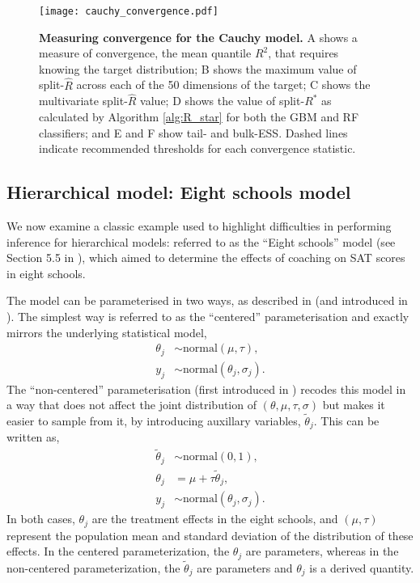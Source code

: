 \documentclass{article}
\begin{document}
\begin{figure}[!htb]
	\centerline{\texttt{[image: cauchy\_convergence.pdf]}}
	\caption{\textbf{Measuring convergence for the Cauchy model.} A shows a measure of convergence, the mean quantile $R^2$, that requires knowing the target distribution; B shows the maximum value of split-$\widehat{R}$ across each of the 50 dimensions of the target; C shows the multivariate split-$\widehat{R}$ value; D shows the value of split-$R^*$ as calculated by Algorithm \ref{alg:R_star} for both the GBM and RF classifiers; and E and F show tail- and bulk-ESS. Dashed lines indicate recommended thresholds for each convergence statistic.}
	\label{fig:cauchy_convergence}
\end{figure}

\subsection{Hierarchical model: Eight schools model}\label{sec:eight_shools}
We now examine a classic example used to highlight difficulties in performing inference for hierarchical models: referred to as the ``Eight schools'' model (see Section 5.5 in \cite{gelman2013bayesian}), which aimed to determine the effects of coaching on SAT scores in eight schools. 

The model can be parameterised in two ways, as described in \cite{vehtari2019rank} (and introduced in \cite{van2001art}). The simplest way is referred to as the ``centered'' parameterisation and exactly mirrors the underlying statistical model,
%
\begin{align*}
\theta_j &\sim \text{normal}(\mu, \tau), \\
y_j &\sim \text{normal}(\theta_j, \sigma_j).
\end{align*}
%
The ``non-centered'' parameterisation (first introduced in \cite{van2001art}) recodes this model in a way that does not affect the joint distribution of $(\theta, \mu, \tau, \sigma)$ but makes it easier to sample from it, by introducing auxillary variables, $\tilde \theta_j$. This can be written as,
%
\begin{align*}
\tilde{\theta}_j &\sim \text{normal}(0, 1), \\
\theta_j &= \mu + \tau \tilde{\theta}_j,\\
y_j &\sim \text{normal}(\theta_j, \sigma_j).
\end{align*}
%
In both cases, $\theta_j$ are the treatment effects in the eight schools, and $(\mu, \tau)$ represent the population mean and standard deviation of the distribution of these effects. In the centered parameterization, the $\theta_j$ are parameters, whereas in the non-centered parameterization, the $\tilde{\theta}_j$ are parameters and $\theta_j$ is a derived quantity.
\end{document}

